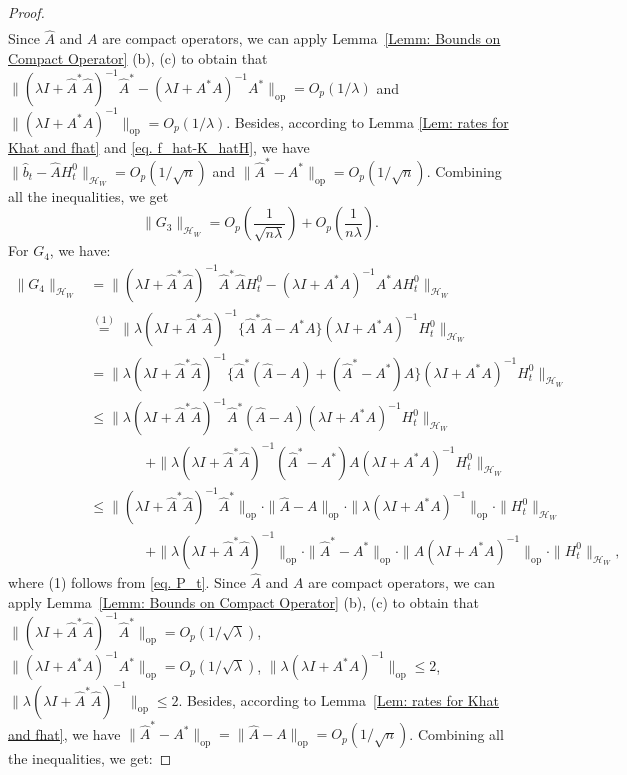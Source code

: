 \documentclass[
  12pt]{article}
\begin{document}
\begin{proof}
\begin{align*}
\end{align*}
Since $\widehat{A}$ and $A$ are compact operators, we can apply Lemma~\ref{Lemm: Bounds on Compact Operator} (b), (c) to obtain that $\| (\lambda I+\widehat{A}^*\widehat{A})^{-1}\widehat{A}^*-(\lambda I+A^*A)^{-1}A^*\|_{\mathrm{op}}=O_p(1/\lambda)$ and $\| (\lambda I+A^*A)^{-1}\|_{\mathrm{op}}=O_p(1/\lambda)$. Besides, according to Lemma \ref{Lem: rates for Khat and fhat} and \ref{eq. f_hat-K_hatH}, we have $\| \widehat{b}_t-\widehat{A}H^0_t\|_{\mathcal{H}_W}=O_p(1/\sqrt{n})$ and $\| \widehat{A}^*-A^*\|_{\mathrm{op}}=O_p(1/\sqrt{n})$. Combining all the inequalities, we get
$$
\|G_3\|_{\mathcal{H}_W}= O_p\left( \frac{1}{\sqrt{n\lambda}} \right)+O_p\left( \frac{1}{n\lambda} \right).
$$
For $G_4$, we have:
\begin{align*}
	\| G_4\|_{\mathcal{H}_W}&=\| (\lambda I+\widehat{A}^*\widehat{A})^{-1}\widehat{A}^*\widehat{A}H^0_t-(\lambda I+A^*A)^{-1}A^*AH^0_t\|_{\mathcal{H}_W}\\
	&\overset{(1)}{=} \| \lambda (\lambda I+\widehat{A}^*\widehat{A})^{-1}\{\widehat{A}^*\widehat{A}-A^*A\}(\lambda I+A^*A)^{-1}H^0_t\|_{\mathcal{H}_W}\\
	&=\| \lambda (\lambda I+\widehat{A}^*\widehat{A})^{-1}\{\widehat{A}^*(\widehat{A}-A)+(\widehat{A}^*-A^*)A\}(\lambda I+A^*A)^{-1}H^0_t\|_{\mathcal{H}_W}\\
	&\le \| \lambda (\lambda I+\widehat{A}^*\widehat{A})^{-1}\widehat{A}^*(\widehat{A}-A)(\lambda I+A^*A)^{-1}H^0_t\|_{\mathcal{H}_W}\\
	& \qquad \qquad +\| \lambda (\lambda I+\widehat{A}^*\widehat{A})^{-1}(\widehat{A}^*-A^*)A(\lambda I+A^*A)^{-1}H^0_t\|_{\mathcal{H}_W}\\
	&\le \| (\lambda I+\widehat{A}^*\widehat{A})^{-1}\widehat{A}^*\|_{\mathrm{op}}\cdot\| \widehat{A}-A\|_{\mathrm{op}}\cdot\| \lambda (\lambda I+A^*A)^{-1}\|_{\mathrm{op}}\cdot \| H^0_t\|_{\mathcal{H}_W}\\
	& \qquad \qquad +\| \lambda (\lambda I+\widehat{A}^*\widehat{A})^{-1}\|_{\mathrm{op}}\cdot\| \widehat{A}^*-A^*\|_{\mathrm{op}}\cdot\| A(\lambda I+A^*A)^{-1}\|_{\mathrm{op}}\cdot \| H^0_t\|_{\mathcal{H}_W},
\end{align*}
where (1) follows from \eqref{eq. P_t}. Since $\widehat{A}$ and $A$ are compact operators, we can apply Lemma~\ref{Lemm: Bounds on Compact Operator} (b), (c) to obtain that $\| (\lambda I+\widehat{A}^*\widehat{A})^{-1}\widehat{A}^*\|_{\mathrm{op}}= O_p(1/\sqrt{\lambda})$, $\| (\lambda I+A^*A)^{-1}A^*\|_{\mathrm{op}}=O_p(1/\sqrt{\lambda})$, $\| \lambda (\lambda I+A^*A)^{-1}\|_{\mathrm{op}} \le2$, $\| \lambda (\lambda I+\widehat{A}^*\widehat{A})^{-1}\|_{\mathrm{op}}\le2$. Besides, according to Lemma~\ref{Lem: rates for Khat and fhat}, we have $\| \widehat{A}^*-A^*\|_{\mathrm{op}}=\| \widehat{A}-A\|_{\mathrm{op}}=O_p(1/\sqrt{n})$. Combining all the inequalities, we get:

\end{proof}
\end{document}
